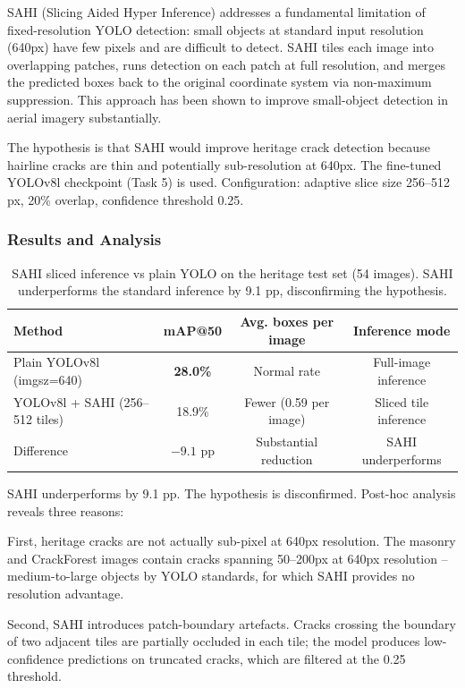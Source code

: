 \documentclass[12pt,a4paper]{article}
\begin{document}
SAHI (Slicing Aided Hyper Inference) addresses a fundamental limitation of fixed-resolution YOLO detection: small objects at standard input resolution (640px) have few pixels and are difficult to detect. SAHI tiles each image into overlapping patches, runs detection on each patch at full resolution, and merges the predicted boxes back to the original coordinate system via non-maximum suppression. This approach has been shown to improve small-object detection in aerial imagery substantially.

The hypothesis is that SAHI would improve heritage crack detection because hairline cracks are thin and potentially sub-resolution at 640px. The fine-tuned YOLOv8l checkpoint (Task 5) is used. Configuration: adaptive slice size 256--512 px, 20\% overlap, confidence threshold 0.25.

\subsubsection{Results and Analysis}

\begin{table}[H]
\centering
\caption{SAHI sliced inference vs plain YOLO on the heritage test set (54 images). SAHI underperforms the standard inference by 9.1 pp, disconfirming the hypothesis.}
\label{tab:sahi}
\begin{tabular}{lccc}
\toprule
\rowcolor{white}
\textbf{Method} & \textbf{mAP@50} & \textbf{Avg. boxes per image} & \textbf{Inference mode} \\
\midrule
Plain YOLOv8l (imgsz=640) & \textbf{28.0\%} & Normal rate & Full-image inference \\
YOLOv8l + SAHI (256--512 tiles) & 18.9\% & Fewer (0.59 per image) & Sliced tile inference \\
\midrule
Difference & $-9.1$ pp & Substantial reduction & SAHI underperforms \\
\bottomrule
\end{tabular}
\end{table}

SAHI underperforms by 9.1 pp. The hypothesis is disconfirmed. Post-hoc analysis reveals three reasons:

First, heritage cracks are not actually sub-pixel at 640px resolution. The masonry and CrackForest images contain cracks spanning 50--200px at 640px resolution -- medium-to-large objects by YOLO standards, for which SAHI provides no resolution advantage.

Second, SAHI introduces patch-boundary artefacts. Cracks crossing the boundary of two adjacent tiles are partially occluded in each tile; the model produces low-confidence predictions on truncated cracks, which are filtered at the 0.25 threshold.
\end{document}
